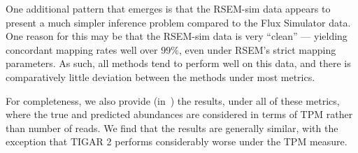 One additional pattern that emerges is that the RSEM-sim data appears to present a much simpler inference problem compared to the Flux Simulator data.  One reason for this may be that the RSEM-sim data is very ``clean'' --- yielding concordant mapping rates well over $99\%$, even under RSEM's strict \bt mapping parameters.  As such, all methods tend to perform well on this data, and there is comparatively little deviation between the methods under most metrics.

For completeness, we also provide (in~) the results, under all of these metrics, where the true and predicted abundances are considered in terms of TPM rather than number of reads.  We find that the results are generally similar, with the exception that TIGAR 2 performs considerably worse under the TPM measure.

\vspace{-0.1in}
